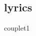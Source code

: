 \documentclass[11pt]{article}
\begin{document}
    \makesongtitle

%    
%
%
    \begin{multicols}{2}
        \section*{lyrics}
        
    \end{multicols}
    {couplet1}
\end{document}
